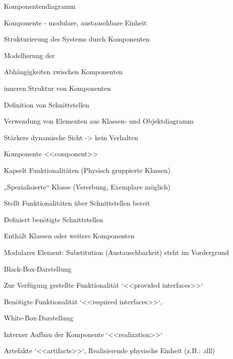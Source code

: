 \documentclass[a4paper]{article}
\begin{document}
\begin{multicols}{3}
\begin{itemize*}
    \item Komponentendiagramm
          \begin{itemize*}
            \item Komponente - modulare, austauschbare Einheit
            \item Strukturierung des Systems durch Komponenten
            \item Modellierung der
                  \begin{itemize*}
                    \item Abhängigkeiten zwischen Komponenten
                    \item inneren Struktur von Komponenten
                  \end{itemize*}
            \item Definition von Schnittstellen
            \item Verwendung von Elementen aus Klassen- und Objektdiagramm
            \item Stärkere dynamische Sicht -> kein Verhalten
            \item Komponente <<component>>
                  \begin{itemize*}
                    \item Kapselt Funktionalitäten (Physisch gruppierte Klassen)
                    \item „Spezialisierte“ Klasse (Vererbung, Exemplare möglich)
                    \item Stellt Funktionalitäten über Schnittstellen bereit
                    \item Definiert benötigte Schnittstellen
                    \item Enthält Klassen oder weitere Komponenten
                    \item Modulares Element: Substitution (Austauschbarkeit) steht im Vordergrund
                  \end{itemize*}
            \item Black-Box-Darstellung
                  \begin{itemize*}
                    \item Zur Verfügung gestellte Funktionalität `<<provided interfaces>>`
                    \item Benötigte Funktionalität `<<required interfaces>>`‚
                  \end{itemize*}
            \item White-Box-Darstellung
                  \begin{itemize*}
                    \item Interner Aufbau der Komponente `<<realization>>`
                    \item Artefakte `<<artifacts>>`‚ Realisierende physische Einheit (z.B.: .dll)
                  \end{itemize*}
          \end{itemize*}
  \end{itemize*}


\end{multicols}
\end{document}

